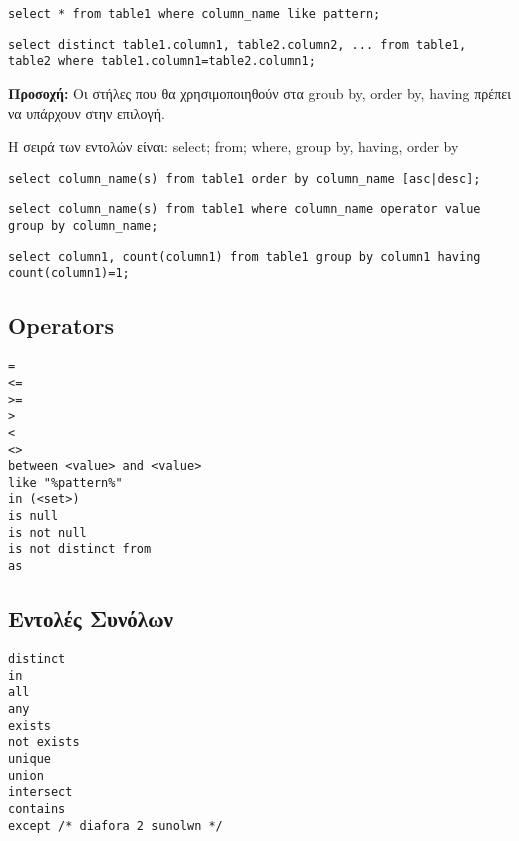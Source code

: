 \begin{lstlisting}[caption=like example]
select * from table1 where column_name like pattern;
\end{lstlisting}

\begin{lstlisting}[caption=distinct example]
select distinct table1.column1, table2.column2, ... from table1, table2 where table1.column1=table2.column1;
\end{lstlisting}

\textbf{Προσοχή:} Oι στήλες που θα χρησιμοποιηθούν στα groub by, order by, having πρέπει να υπάρχουν στην επιλογή.

Η σειρά των εντολών είναι: select; from; where, group by, having, order by

\begin{lstlisting}[caption=order by example]
select column_name(s) from table1 order by column_name [asc|desc];
\end{lstlisting}

\begin{lstlisting}[caption=group by example]
select column_name(s) from table1 where column_name operator value group by column_name;
\end{lstlisting}

\begin{lstlisting}[caption=having example]
select column1, count(column1) from table1 group by column1 having count(column1)=1;
\end{lstlisting}

\subsection{Operators}

\begin{lstlisting}[caption=operators list]
=
<=
>=
>
<
<>
between <value> and <value>
like "%pattern%"
in (<set>)
is null
is not null
is not distinct from
as
\end{lstlisting}

\subsection{Εντολές Συνόλων}

\begin{lstlisting}[caption=set commands]
distinct
in
all
any
exists
not exists
unique
union
intersect
contains
except /* diafora 2 sunolwn */
\end{lstlisting}

